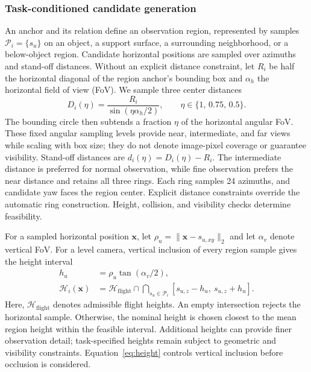 \documentclass[letterpaper,10pt,journal]{IEEEtran}
\begin{document}
\subsubsection{Task-conditioned candidate generation}
An anchor and its relation define an observation region, represented by samples $\mathcal P_i=\{s_u\}$ on an object, a support surface, a surrounding neighborhood, or a below-object region. Candidate horizontal positions are sampled over azimuths and stand-off distances. Without an explicit distance constraint, let $R_i$ be half the horizontal diagonal of the region anchor's bounding box and $\alpha_h$ the horizontal field of view (FoV). We sample three center distances
\begin{equation}
D_i(\eta)=\frac{R_i}{\sin(\eta\alpha_h/2)},\qquad
\eta\in\{1,\,0.75,\,0.5\}.
\end{equation}
The bounding circle then subtends a fraction $\eta$ of the horizontal angular FoV. These fixed angular sampling levels provide near, intermediate, and far views while scaling with box size; they do not denote image-pixel coverage or guarantee visibility. Stand-off distances are $d_i(\eta)=D_i(\eta)-R_i$. The intermediate distance is preferred for normal observation, while fine observation prefers the near distance and retains all three rings. Each ring samples 24 azimuths, and candidate yaw faces the region center. Explicit distance constraints override the automatic ring construction. Height, collision, and visibility checks determine feasibility.

For a sampled horizontal position $\bm x$, let $\rho_u=\|\bm x-s_{u,xy}\|_2$ and let $\alpha_v$ denote vertical FoV. For a level camera, vertical inclusion of every region sample gives the height interval
\begin{equation}
\begin{aligned}
h_u&=\rho_u\tan(\alpha_v/2),\\
\mathcal H_i(\bm x)&=\mathcal H_{\mathrm{flight}}\cap
\bigcap_{s_u\in\mathcal P_i}[s_{u,z}-h_u,\ s_{u,z}+h_u].
\end{aligned}
\label{eq:height}
\end{equation}
Here, $\mathcal H_{\mathrm{flight}}$ denotes admissible flight heights. An empty intersection rejects the horizontal sample. Otherwise, the nominal height is chosen closest to the mean region height within the feasible interval. Additional heights can provide finer observation detail; task-specified heights remain subject to geometric and visibility constraints. Equation~\ref{eq:height} controls vertical inclusion before occlusion is considered.
\end{document}
